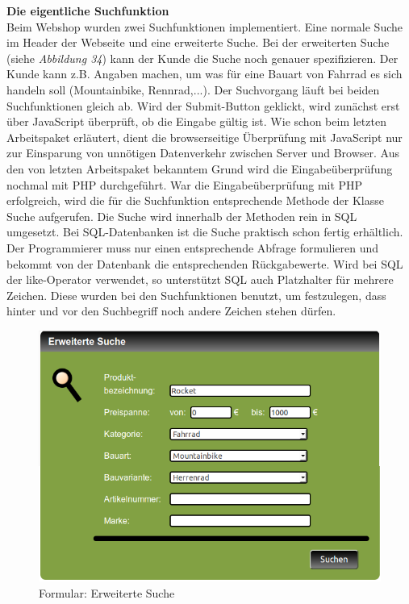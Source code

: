 \newpage
\textbf{Die eigentliche Suchfunktion}\\
Beim Webshop wurden zwei Suchfunktionen implementiert. Eine \glqq normale\grqq{} Suche im Header der Webseite und eine \glqq erweiterte\grqq{} Suche. Bei der erweiterten Suche (siehe \textit{Abbildung 34}) kann der Kunde die Suche noch genauer spezifizieren. Der Kunde kann z.B. Angaben machen, um was für eine Bauart von Fahrrad es sich handeln soll (Mountainbike, Rennrad,...). Der Suchvorgang läuft bei beiden Suchfunktionen gleich ab. Wird der Submit-Button geklickt, wird zunächst erst über JavaScript überprüft, ob die Eingabe gültig ist. Wie schon beim letzten Arbeitspaket erläutert, dient die browserseitige Überprüfung mit JavaScript nur zur Einsparung von unnötigen Datenverkehr zwischen Server und Browser. Aus den von letzten Arbeitspaket bekanntem Grund wird die Eingabeüberprüfung nochmal mit PHP durchgeführt. War die Eingabeüberprüfung mit PHP erfolgreich, wird die für die Suchfunktion entsprechende Methode der Klasse \glqq Suche\grqq{} aufgerufen. Die Suche wird innerhalb der Methoden rein in SQL umgesetzt. Bei SQL-Datenbanken ist die Suche praktisch schon fertig erhältlich. Der Programmierer muss nur einen entsprechende Abfrage formulieren und bekommt von der Datenbank die entsprechenden Rückgabewerte. Wird bei SQL der \glqq like\grqq{}-Operator verwendet, so unterstützt SQL auch Platzhalter für mehrere Zeichen. Diese wurden bei den Suchfunktionen benutzt, um festzulegen, dass hinter und vor den Suchbegriff noch andere Zeichen stehen dürfen.

\begin{figure}[H]
	\begin{center}
			\includegraphics[width=115mm]{Bilder/erweiterte_suche.png}
	\end{center}
	\caption{Formular: Erweiterte Suche}
\end{figure}

